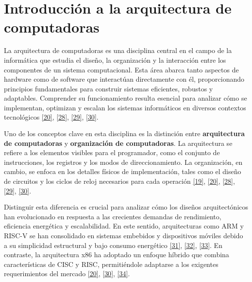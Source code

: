 \documentclass[12pt,oneside]{templates/unerthesis}
\begin{document}
\hypertarget{introducciuxf3n-a-la-arquitectura-de-computadoras}{%
\section{Introducción a la arquitectura de computadoras}\label{introducciuxf3n-a-la-arquitectura-de-computadoras}}

La arquitectura de computadoras es una disciplina central en el campo de la informática que estudia el diseño, la organización y la interacción entre los componentes de un sistema computacional. Esta área abarca tanto aspectos de hardware como de software que interactúan directamente con él, proporcionando principios fundamentales para construir sistemas eficientes, robustos y adaptables. Comprender su funcionamiento resulta esencial para analizar cómo se implementan, optimizan y escalan los sistemas informáticos en diversos contextos tecnológicos \protect\hyperlink{ref-stallings_computer_2021}{{[}20{]}}, \protect\hyperlink{ref-tanenbaum_structured_2016}{{[}28{]}}, \protect\hyperlink{ref-murdocca_principles_2000}{{[}29{]}}, \protect\hyperlink{ref-bryant2015computer}{{[}30{]}}.

Uno de los conceptos clave en esta disciplina es la distinción entre \textbf{arquitectura de computadoras} y \textbf{organización de computadoras}. La arquitectura se refiere a los elementos visibles para el programador, como el conjunto de instrucciones, los registros y los modos de direccionamiento. La organización, en cambio, se enfoca en los detalles físicos de implementación, tales como el diseño de circuitos y los ciclos de reloj necesarios para cada operación \protect\hyperlink{ref-hennessy2017computer}{{[}19{]}}, \protect\hyperlink{ref-stallings_computer_2021}{{[}20{]}}, \protect\hyperlink{ref-tanenbaum_structured_2016}{{[}28{]}}, \protect\hyperlink{ref-murdocca_principles_2000}{{[}29{]}}, \protect\hyperlink{ref-bryant2015computer}{{[}30{]}}.

Distinguir esta diferencia es crucial para analizar cómo los diseños arquitectónicos han evolucionado en respuesta a las crecientes demandas de rendimiento, eficiencia energética y escalabilidad. En este sentido, arquitecturas como ARM y RISC-V se han consolidado en sistemas embebidos y dispositivos móviles debido a su simplicidad estructural y bajo consumo energético \protect\hyperlink{ref-waterman_risc-v_2014}{{[}31{]}}, \protect\hyperlink{ref-harris2015digital}{{[}32{]}}, \protect\hyperlink{ref-null_essentials_2023}{{[}33{]}}. En contraste, la arquitectura x86 ha adoptado un enfoque híbrido que combina características de CISC y RISC, permitiéndole adaptarse a los exigentes requerimientos del mercado \protect\hyperlink{ref-stallings_computer_2021}{{[}20{]}}, \protect\hyperlink{ref-bryant2015computer}{{[}30{]}}, \protect\hyperlink{ref-patterson_computer_2014}{{[}34{]}}.
\end{document}
